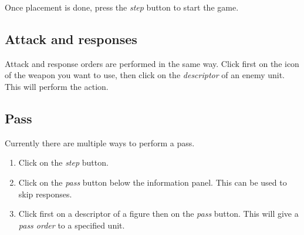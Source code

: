\documentclass[a4paper]{article}
\begin{document}
	Once placement is done, press the \textit{step} button to start the game.

	\subsection{Attack and responses}

	Attack and response orders are performed in the same way. Click first on the icon of the weapon you want to use, then click on the \textit{descriptor} of an enemy unit. This will perform the action.

	\subsection{Pass}

	Currently there are multiple ways to perform a pass.

	\begin{enumerate}
		\item Click on the \textit{step} button.
		
		\item Click on the \textit{pass} button below the information panel. This can be used to skip responses.
		
		\item Click first on a descriptor of a figure then on the \textit{pass} button. This will give a \textit{pass order} to a specified unit.
	\end{enumerate}

\end{document}
